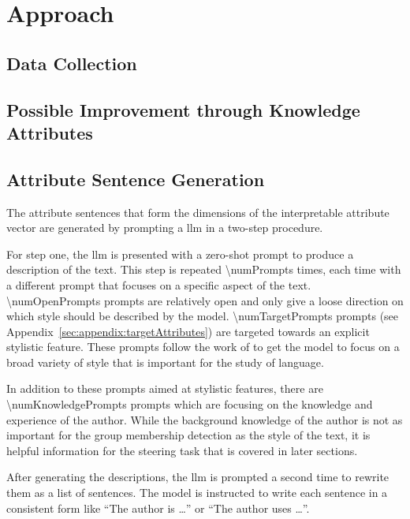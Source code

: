 \chapter{Approach}
\label{sec:approach}


\section{Data Collection}
\label{sec:approach:dataCollection}


\section{Possible Improvement through Knowledge Attributes}
\label{sec:approach:knowledgeAttributes}


\section{Attribute Sentence Generation}
\label{sec:approach:attributeSentenceGeneration}

The attribute sentences that form the dimensions of the interpretable attribute vector are generated by prompting a \acl{llm} in a two-step procedure.

For step one, the \ac{llm} is presented with a zero-shot prompt to produce a description of the text. This step is repeated \num{\numPrompts} times, each time with a different prompt that focuses on a specific aspect of the text. \num{\numOpenPrompts} prompts are relatively open and only give a loose direction on which style should be described by the model. \num{\numTargetPrompts} prompts (see Appendix~\ref{sec:appendix:targetAttributes}) are targeted towards an explicit stylistic feature. These prompts follow the work of \citet{patelLearningInterpretableStyle2023,tausczikPsychologicalMeaningWords2010} to get the model to focus on a broad variety of style that is important for the study of language.

In addition to these prompts aimed at stylistic features, there are \num{\numKnowledgePrompts} prompts which are focusing on the knowledge and experience of the author. While the background knowledge of the author is not as important for the group membership detection as the style of the text, it is helpful information for the steering task that is covered in later sections.

After generating the descriptions, the \ac{llm} is prompted a second time to rewrite them as a list of sentences. The model is instructed to write each sentence in a consistent form like \enquote{The author is \ldots} or \enquote{The author uses \ldots}.

